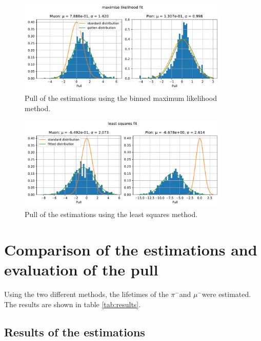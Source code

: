 \documentclass[11pt, a4paper, oneside]{book}
\newcommand\DoublePlotwidth{0.9}
\newcommand{\pion}{$\pi^{-}$}
\newcommand{\muon}{$\mu^{-}$}
\begin{document}
\begin{figure}[H]
  \centering
  \includegraphics[width=\DoublePlotwidth\textwidth]{images/estimators_pull_likelihood.pdf}
  \caption{Pull of the estimations using the binned maximum likelihood method.}
  \label{fig:pull_likelihood_method}
\end{figure}

\begin{figure}[H]
  \centering
  \includegraphics[width=\DoublePlotwidth\textwidth]{images/estimators_pull_least_squares.pdf}
  \caption{Pull of the estimations using the least squares method.}
  \label{fig:pull_least_squares_method}
\end{figure}

\section{Comparison of the estimations and evaluation of the pull}
Using the two different methods, the lifetimes of the \pion and \muon were estimated. The results are shown in table \ref{tab:results}.

\subsection{Results of the estimations}
\end{document}
